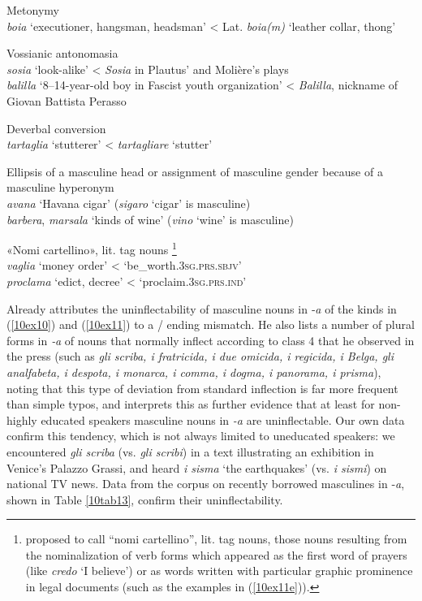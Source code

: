 \documentclass[output=paper,colorlinks,citecolor=brown]{langscibook}
\begin{document}
\begin{exe}
	\ex \label{10ex11}
	\begin{xlist}
		
		\ex Metonymy \\
		\emph{boia} ‘executioner, hangsman, headsman’ < Lat. \emph{boia(m)} ‘leather collar, thong’
		
		\ex Vossianic antonomasia \\
		\emph{sosia} ‘look-alike’ < \emph{Sosia} in Plautus’ and Molière’s plays\\
		\emph{balilla} ‘8–14-year-old boy in Fascist youth organization’ < \emph{Balilla}, nickname of Giovan Battista Perasso
		
		\ex Deverbal conversion \\
		\emph{tartaglia} ‘stutterer’ < \emph{tartagliare} ‘stutter’
		
		\ex Ellipsis of a masculine head or assignment of masculine gender because of a masculine hyperonym \\
		\emph{avana} ‘Havana cigar’ (\emph{sigaro} ‘cigar’ is masculine)\\
		\emph{barbera}, \emph{marsala} ‘kinds of wine’ (\emph{vino} ‘wine’ is masculine)
		
		\ex \label{10ex11e} «Nomi cartellino», lit. tag nouns \citep{migliorini1975}\footnote{\citet{migliorini1975} proposed to call “nomi cartellino”, lit. tag nouns, those nouns resulting from the nominalization of verb forms which appeared as the first word of prayers (like \emph{credo} ‘I believe’) or as words written with particular graphic prominence in legal documents (such as the examples in (\ref{10ex11e})).}\\
		\emph{vaglia} ‘money order’ < ‘be\_worth.\textsc{3sg.prs.sbjv}’\\
		\emph{proclama} ‘edict, decree’ < ‘proclaim.\textsc{3sg.prs.ind}’
		
	\end{xlist}
\end{exe}


Already \citet[104--108]{migliorini1957} attributes the uninflectability of masculine nouns in ‑\emph{a} of the kinds in (\ref{10ex10}) and (\ref{10ex11}) to a  / ending mismatch. He also lists a number of plural forms in \emph{‑a} of
nouns that normally inflect according to class 4 that he observed in the press (such as \emph{gli scriba, i fratricida, i due omicida, i regicida, i Belga, gli analfabeta, i despota, i monarca, i comma, i dogma, i panorama, i prisma}), noting that this type of deviation from standard inflection is far more frequent than simple typos, and interprets this as further evidence that at least for non-highly educated speakers masculine nouns in \emph{-a} are uninflectable. Our own data confirm this tendency, which is not always limited to uneducated speakers: we encountered \emph{gli scriba} (vs. \emph{gli scribi}) in a text illustrating an exhibition in Venice's Palazzo Grassi, and heard \emph{i sisma} `the earthquakes' (vs. \emph{i sismi}) on national TV news. Data from the  corpus on recently borrowed masculines in ‑\emph{a}, shown in Table \ref{10tab13}, confirm their uninflectability.
\end{document}

